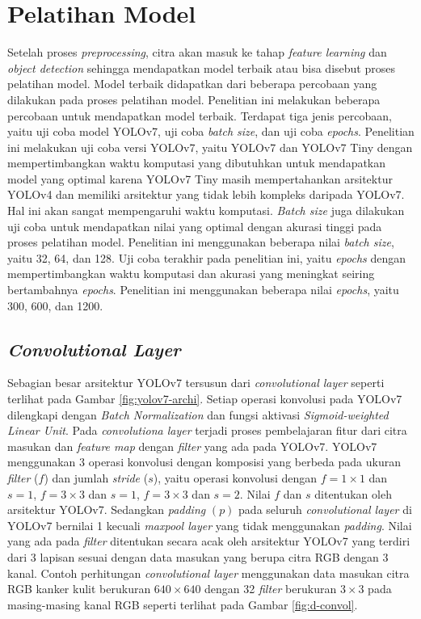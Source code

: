 \section{Pelatihan Model}
Setelah proses \textit{preprocessing}, citra akan masuk ke tahap \textit{feature learning} dan \textit{object detection} sehingga mendapatkan model terbaik atau bisa disebut proses pelatihan model. Model terbaik didapatkan dari beberapa percobaan yang dilakukan pada proses pelatihan model. Penelitian ini melakukan beberapa percobaan untuk mendapatkan model terbaik. Terdapat tiga jenis percobaan, yaitu uji coba model YOLOv7, uji coba \textit{batch size}, dan uji coba \textit{epochs}. Penelitian ini melakukan uji coba versi YOLOv7, yaitu YOLOv7 dan YOLOv7 Tiny dengan mempertimbangkan waktu komputasi yang dibutuhkan untuk mendapatkan model yang optimal karena YOLOv7 Tiny masih mempertahankan arsitektur YOLOv4 dan memiliki arsitektur yang tidak lebih kompleks daripada YOLOv7. Hal ini akan sangat mempengaruhi waktu komputasi. \textit{Batch size} juga dilakukan uji coba untuk mendapatkan nilai yang optimal dengan akurasi tinggi pada proses pelatihan model. Penelitian ini menggunakan beberapa nilai \textit{batch size}, yaitu 32, 64, dan 128. Uji coba terakhir pada penelitian ini, yaitu \textit{epochs} dengan mempertimbangkan waktu komputasi dan akurasi yang meningkat seiring bertambahnya \textit{epochs}. Penelitian ini menggunakan beberapa nilai \textit{epochs}, yaitu 300, 600, dan 1200.
    \subsection{\textit{Convolutional Layer}}
    Sebagian besar arsitektur YOLOv7 tersusun dari \textit{convolutional layer} seperti terlihat pada Gambar \ref{fig:yolov7-archi}. Setiap operasi konvolusi pada YOLOv7 dilengkapi dengan \textit{Batch Normalization} dan fungsi aktivasi \textit{Sigmoid-weighted Linear Unit}. Pada \textit{convolutiona layer} terjadi proses pembelajaran fitur dari citra masukan dan \textit{feature map} dengan \textit{filter} yang ada pada YOLOv7. YOLOv7 menggunakan 3 operasi konvolusi dengan komposisi yang berbeda pada ukuran \textit{filter} ($f$) dan jumlah \textit{stride} ($s$), yaitu operasi konvolusi dengan $f=1\times 1$ dan $s=1$, $f=3\times 3$ dan $s=1$, $f=3\times 3$ dan $s=2$. Nilai $f$ dan $s$ ditentukan oleh arsitektur YOLOv7. Sedangkan \textit{padding} $(p)$ pada seluruh \textit{convolutional layer} di YOLOv7 bernilai 1 kecuali \textit{maxpool layer} yang tidak menggunakan \textit{padding}. Nilai yang ada pada \textit{filter} ditentukan secara acak oleh arsitektur YOLOv7 yang terdiri dari 3 lapisan sesuai dengan data masukan yang berupa citra RGB dengan 3 kanal. Contoh perhitungan \textit{convolutional layer} menggunakan data masukan citra RGB kanker kulit berukuran $640\times 640$ dengan 32 \textit{filter} berukuran $3\times 3$ pada masing-masing kanal RGB seperti terlihat pada Gambar \ref{fig:d-convol}.

